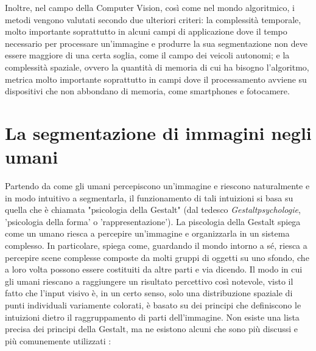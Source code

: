 Inoltre, nel campo della Computer Vision, così come nel mondo algoritmico, i metodi vengono valutati secondo due ulteriori criteri: la complessità temporale, molto importante soprattutto in alcuni campi di applicazione dove il tempo necessario per processare un'immagine e produrre la sua segmentazione non deve essere maggiore di una certa soglia, come il campo dei veicoli autonomi; e la complessità spaziale, ovvero la quantità di memoria di cui ha bisogno l'algoritmo, metrica molto importante soprattutto in campi dove il processamento avviene su dispositivi che non abbondano di memoria, come smartphones e fotocamere.












\section{La segmentazione di immagini negli umani}
Partendo da come gli umani percepiscono un'immagine e riescono naturalmente e in modo intuitivo a segmentarla, il funzionamento di tali intuizioni si basa su quella che è chiamata "psicologia della Gestalt" \cite{gestalt} (dal tedesco \textit{Gestaltpsychologie}, 'psicologia della forma' o 'rappresentazione'). La piscologia della Gestalt spiega come un umano riesca a percepire un'immagine e organizzarla in un sistema complesso. In particolare, spiega come, guardando il mondo intorno a sé, riesca a percepire scene complesse composte da molti gruppi di oggetti su uno sfondo, che a loro volta possono essere costituiti da altre parti e via dicendo.
Il modo in cui gli umani riescano a raggiungere un risultato percettivo così notevole, visto il fatto che l'input visivo è, in un certo senso, solo una distribuzione spaziale di punti individuali variamente colorati, è basato su dei principi che definiscono le intuizioni dietro il raggruppamento di parti dell'immagine. Non esiste una lista precisa dei principi della Gestalt, ma ne esistono alcuni che sono più discussi e più comunemente utilizzati \cite{todorovic2008gestalt}:

